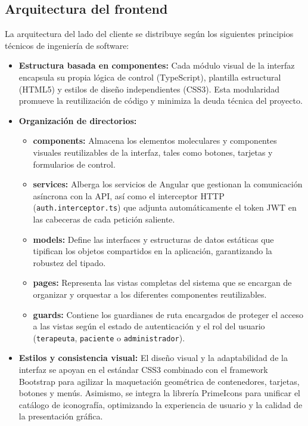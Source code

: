 \subsection{Arquitectura del frontend}
La arquitectura del lado del cliente se distribuye según los siguientes principios técnicos de ingeniería de software:
\begin{itemize}
    \item \textbf{Estructura basada en componentes:} Cada módulo visual de la interfaz encapsula su propia lógica de control (TypeScript), plantilla estructural (HTML5) y estilos de diseño independientes (CSS3). Esta modularidad promueve la reutilización de código y minimiza la deuda técnica del proyecto.
    \item \textbf{Organización de directorios:}
    \begin{itemize}
        \item \textbf{components:} Almacena los elementos moleculares y componentes visuales reutilizables de la interfaz, tales como botones, tarjetas y formularios de control.
        \item \textbf{services:} Alberga los servicios de Angular que gestionan la comunicación asíncrona con la API, así como el interceptor HTTP (\texttt{auth.interceptor.ts}) que adjunta automáticamente el token JWT en las cabeceras de cada petición saliente.
        \item \textbf{models:} Define las interfaces y estructuras de datos estáticas que tipifican los objetos compartidos en la aplicación, garantizando la robustez del tipado.
        \item \textbf{pages:} Representa las vistas completas del sistema que se encargan de organizar y orquestar a los diferentes componentes reutilizables.
        \item \textbf{guards:} Contiene los guardianes de ruta encargados de proteger el acceso a las vistas según el estado de autenticación y el rol del usuario (\texttt{terapeuta}, \texttt{paciente} o \texttt{administrador}).
    \end{itemize}
    \item \textbf{Estilos y consistencia visual:} El diseño visual y la adaptabilidad de la interfaz se apoyan en el estándar CSS3 combinado con el framework Bootstrap para agilizar la maquetación geométrica de contenedores, tarjetas, botones y menús. Asimismo, se integra la librería PrimeIcons para unificar el catálogo de iconografía, optimizando la experiencia de usuario y la calidad de la presentación gráfica.
\end{itemize}

